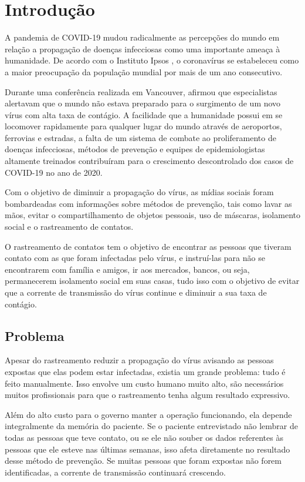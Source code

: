 \chapter{Introdução}\label{chp:Introducao}

A pandemia de COVID-19 mudou radicalmente as percepções do mundo em relação a propagação de doenças infecciosas como uma importante ameaça à humanidade. De acordo com o Instituto Ipsos \cite{Gebrekal2021}, o coronavírus se estabeleceu como a maior preocupação da população mundial por mais de um ano consecutivo.

Durante uma conferência realizada em Vancouver, \textcite{Gates2015} afirmou que especialistas alertavam que o mundo não estava preparado para o surgimento de um novo vírus com alta taxa de contágio. A facilidade que a humanidade possui em se locomover rapidamente para qualquer lugar do mundo através de aeroportos, ferrovias e estradas, a falta de um sistema de combate ao proliferamento de doenças infecciosas, métodos de prevenção e equipes de epidemiologistas altamente treinados contribuíram para o crescimento descontrolado dos casos de COVID-19 no ano de 2020.

Com o objetivo de diminuir a propagação do vírus, as mídias sociais foram bombardeadas com informações sobre métodos de prevenção, tais como lavar as mãos, evitar o compartilhamento de objetos pessoais, uso de máscaras, isolamento social e o rastreamento de contatos.

O rastreamento de contatos tem o objetivo de encontrar as pessoas que tiveram contato com as que foram infectadas pelo vírus, e instruí-las para não se encontrarem com família e amigos, ir aos mercados, bancos, ou seja, permanecerem isolamento social em suas casas, tudo isso com o objetivo de evitar que a corrente de transmissão do vírus continue e diminuir a sua taxa de contágio.

\section{Problema}\label{sec:problema}
Apesar do rastreamento reduzir a propagação do vírus avisando as pessoas expostas que elas podem estar infectadas, existia um grande problema: tudo é feito manualmente. Isso envolve um custo humano muito alto, são necessários muitos profissionais para que o rastreamento tenha algum resultado expressivo.

Além do alto custo para o governo manter a operação funcionando, ela depende integralmente da memória do paciente. Se o paciente entrevistado não lembrar de todas as pessoas que teve contato, ou se ele não souber os dados referentes às pessoas que ele esteve nas últimas semanas, isso afeta diretamente no resultado desse método de prevenção. Se muitas pessoas que foram expostas não forem identificadas, a corrente de transmissão continuará crescendo.

